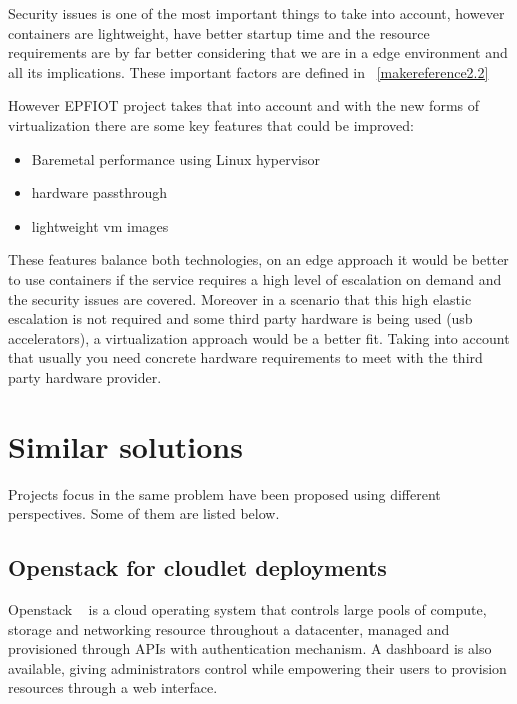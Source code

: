 Security issues is one of the most important things to take into account, however containers are lightweight, have better startup time and the resource requirements are by far better considering that we are in a edge environment and all its implications. These important factors are defined in ~\ref{makereference2.2}

However EPFIOT project takes that into account and with the new forms of virtualization there are some key features that could be improved:
\begin{itemize}
    \item Baremetal performance using Linux hypervisor
    \item hardware passthrough
    \item lightweight vm images
\end{itemize}

These features balance both technologies, on an edge approach it would be better to use containers if the service requires a high level of escalation on demand and the security issues are covered. Moreover in a scenario that  this high elastic escalation is not required and some third party hardware is being used (usb accelerators), a virtualization approach would be a better fit. Taking into account that usually you need concrete hardware requirements to meet with the third party hardware provider.

\newpage

\section{Similar solutions}
\label{makereference2.3}

Projects focus in the same problem have been proposed using different perspectives. Some of them are listed below.

\subsection{Openstack for cloudlet deployments}
\label{makereference2.3.1}

Openstack ~\cite{openstack} is a cloud operating system that controls large pools of compute, storage and networking resource throughout a datacenter, managed and provisioned through APIs with authentication mechanism.
A dashboard is also available, giving administrators control while empowering their users to provision resources through a web interface. 

